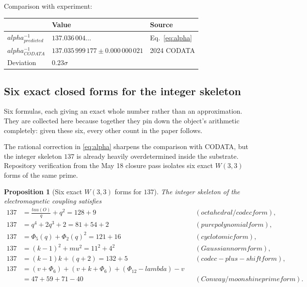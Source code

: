 \documentclass[12pt,a4paper]{article}
\def\mathbf#1{#1}%
\def\textbf#1{#1}%
\def\text#1{#1}%
\def\alpha{alpha}%
\def\lambda{lambda}%
\def\mu{mu}%
\def\Phi#1{Phi#1}%
\def\tau{tau}%
\newtheorem{proposition}[theorem]{Proposition}
\theoremstyle{definition}
\begin{document}
\noindent\textbf{Comparison with experiment:}
\begin{center}
\begin{tabular}{lll}
\toprule
& Value & Source \\
\midrule
$\alpha^{-1}_{\text{predicted}}$ & $137.036\,004\ldots$ & Eq.~\eqref{eq:alpha} \\
$\alpha^{-1}_{\text{CODATA}}$ & $137.035\,999\,177\pm 0.000\,000\,021$ & 2024 CODATA \\
Deviation & $\mathbf{0.23\sigma}$ & \\
\bottomrule
\end{tabular}
\end{center}

\subsection{Six exact closed forms for the integer skeleton}

\begin{plainbox}
Six formulas, each giving an exact whole number rather than an approximation. They
are collected here because together they pin down the object's arithmetic completely: given
these six, every other count in the paper follows.
\end{plainbox}


The rational correction in \eqref{eq:alpha} sharpens the comparison with
CODATA, but the integer skeleton $137$ is already heavily overdetermined
inside the substrate.  Repository verification from the May 18 closure pass
isolates six exact $W(3,3)$ forms of the same prime.

\begin{proposition}[Six exact $W(3,3)$ forms for $137$]
\label{prop:alpha-six-forms}
The integer skeleton of the electromagnetic coupling satisfies
\begin{equation}
\renewcommand{\arraystretch}{1.2}
\begin{aligned}
137 &= \frac{\tau(O)}{q}+q^2 = 128+9
&&\text{(octahedral / codec form)},\\
137 &= q^4+2q^3+2 = 81+54+2
&&\text{(pure polynomial form)},\\
137 &= \Phi_5(q)+\Phi_2(q)^2 = 121+16
&&\text{(cyclotomic form)},\\
137 &= (k-1)^2+\mu^2 = 11^2+4^2
&&\text{(Gaussian norm form)},\\
137 &= (k-1)k + (q+2) = 132+5
&&\text{(codec-plus-shift form)},\\
137 &= (v+\Phi_6) + (v+k+\Phi_6) + (\Phi_{12}-\lambda) - v \\
  &= 47+59+71-40
&&\text{(Conway / moonshine prime form)}.
\end{aligned}
\label{eq:alpha-six-forms}
\end{equation}
\end{proposition}
\end{document}
